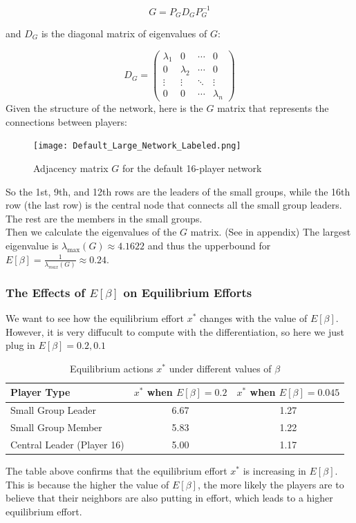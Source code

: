 \documentclass[12pt]{article}
\begin{document}
\[
G = P_G D_G P_G^{-1}
\]

and $D_G$ is the diagonal matrix of eigenvalues of $G$:

\[
D_G = 
\begin{pmatrix}
\lambda_1 & 0 & \cdots & 0 \\
0 & \lambda_2 & \cdots & 0 \\
\vdots & \vdots & \ddots & \vdots \\
0 & 0 & \cdots & \lambda_n
\end{pmatrix}
\]
Given the structure of the network, here is the $G$ matrix that represents the connections between players:
\begin{figure}[H]
  \centering
  \texttt{[image: Default\_Large\_Network\_Labeled.png]}
  \caption{Adjacency matrix $G$ for the default 16-player network}
  \label{fig:G-matrix}
\end{figure}
So the 1st, 9th, and 12th rows are the leaders of the small groups, while the 16th row (the last row) is the central node that connects all the small group leaders. The rest are the members in the small groups.\\
Then we calculate the eigenvalues of the $G$ matrix. (See in appendix) The largest eigenvalue is $\lambda_{\text{max}}(G)  \approx 4.1622$ and thus the upperbound for $E[\beta] = \frac{1}{\lambda_{max}(G)} \approx 0.24$.\\
\subsubsection*{The Effects of $E[\beta]$ on Equilibrium Efforts}
We want to see how the equilibrium effort $x^*$ changes with the value of $E[\beta]$. However, it is very diffucult to compute with the differentiation, so here we just plug in $E[\beta]=0.2,0.1$\\
\begin{table}[H]
  \centering
  \begin{tabular}{lcc}
  \toprule
  \textbf{Player Type} & \textbf{\( x^* \) when \( E[\beta] = 0.2 \)} & \textbf{\( x^* \) when \( E[\beta] = 0.045 \)} \\
  \midrule
  Small Group Leader       & 6.67 & 1.27 \\
  Small Group Member       & 5.83 & 1.22 \\
  Central Leader (Player 16) & 5.00 & 1.17 \\
  \bottomrule
  \end{tabular}
  \caption{Equilibrium actions \( x^* \) under different values of \( \beta \)}
  \label{tab:xstar-beta}
  \end{table}
The table above confirms that the equilibrium effort \( x^* \) is increasing in \( E[\beta] \). This is because the higher the value of \( E[\beta] \), the more likely the players are to believe that their neighbors are also putting in effort, which leads to a higher equilibrium effort.\\
\end{document}
